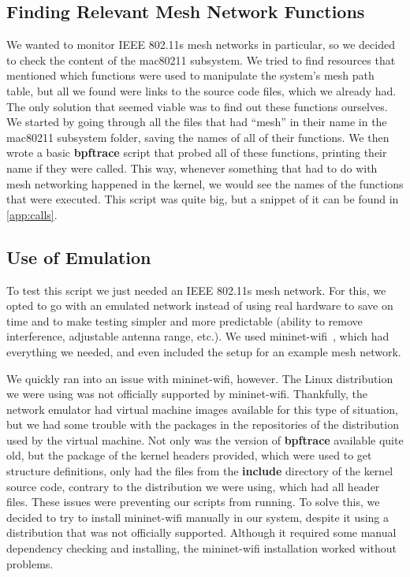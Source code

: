 \subsection{Finding Relevant Mesh Network Functions}\label{subs:mesh}

We wanted to monitor \ac{IEEE} 802.11s mesh networks in particular, so we
decided to check the content of the mac80211 subsystem. We tried to find
resources that mentioned which functions were used to manipulate the system's
mesh path table, but all we found were links to the source code files, which we
already had. The only solution that seemed viable was to find out these
functions ourselves. We started by going through all the files that had ``mesh''
in their name in the mac80211 subsystem folder, saving the names of all of their
functions. We then wrote a basic \textbf{bpftrace} script that probed all of
these functions, printing their name if they were called. This way, whenever
something that had to do with mesh networking happened in the kernel, we would
see the names of the functions that were executed. This script was quite big,
but a snippet of it can be found in \autoref{app:calls}.


\subsection{Use of Emulation}

To test this script we just needed an \ac{IEEE} 802.11s mesh network. For this,
we opted to go with an emulated network instead of using real hardware to save
on time and to make testing simpler and more predictable (ability to remove
interference, adjustable antenna range, etc.). We used
mininet-wifi~\cite{mnwifi}, which had everything we needed, and even included
the setup for an example mesh network.

We quickly ran into an issue with mininet-wifi, however. The Linux distribution
we were using was not officially supported by mininet-wifi. Thankfully, the
network emulator had virtual machine images available for this type of
situation, but we had some trouble with the packages in the repositories of the
distribution used by the virtual machine. Not only was the version of
\textbf{bpftrace} available quite old, but the package of the kernel headers
provided, which were used to get structure definitions, only had the files from
the \textbf{include} directory of the kernel source code, contrary to the
distribution we were using, which had all header files. These issues were
preventing our scripts from running. To solve this, we decided to try to install
mininet-wifi manually in our system, despite it using a distribution that was
not officially supported. Although it required some manual dependency checking
and installing, the mininet-wifi installation worked without problems.


